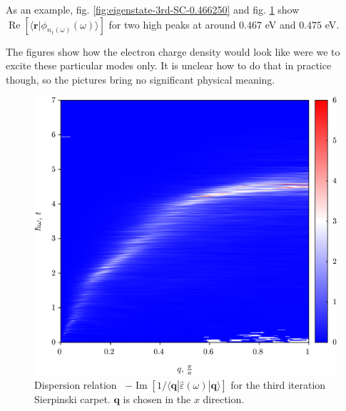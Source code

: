 \documentclass[a4paper,12pt]{article}
\begin{document}
    As an example, fig. \ref{fig:eigenstate-3rd-SC-0.466250} and fig. \ref{fig:eigenstate-3rd-SC-real-0.474250} show $\operatorname{Re} [\langle \mathbf{r} | \phi_{n_1(\omega)}(\omega) \rangle]$ for two high peaks at around $0.467$ eV and $0.475$ eV. 
    \begin{figure}[h] 
    \begin{minipage}{.5\textwidth}
        
        \captionsetup{width=0.9\linewidth}
        \label{fig:eigenstate-3rd-SC-0.466250}
    \end{minipage}%
    \begin{minipage}{.5\textwidth}
        
        \captionsetup{width=0.9\linewidth}
        \label{fig:eigenstate-3rd-SC-real-0.474250}
    \end{minipage}
    \end{figure}
    The figures show how the electron charge density would look like were we to excite these particular modes only. It is unclear how to do that in practice though, so the pictures bring no significant physical meaning.

    \begin{figure}[h]
    \center
    \includegraphics[width=\textwidth]{Spectrum-3rd-Q-Omega.png}
    \caption{Dispersion relation \ $-\operatorname{Im}[1 / \langle\mathbf{q}| \hat\varepsilon(\omega) |\mathbf{q}\rangle]$ for the third iteration Sierpinski carpet. $\mathbf{q}$ is chosen in the $x$ direction.}
    \label{fig:spectrum-3rd-Q-Omega}
    \end{figure}
\end{document}
